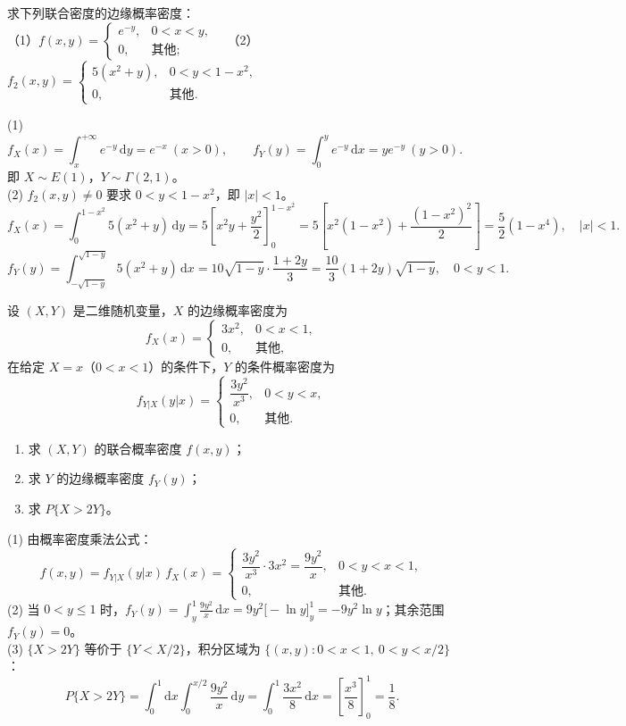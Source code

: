 ﻿\documentclass[lang=cn,11pt]{elegantbook}
\begin{document}
\begin{exercise}[两种边缘密度计算] \label{exer:3-c10}
求下列联合密度的边缘概率密度：\\
（1）$f(x,y) = \begin{cases} e^{-y}, & 0 < x < y, \\ 0, & \text{其他}; \end{cases}$~~（2）$f_2(x,y) = \begin{cases} 5(x^2+y), & 0 < y < 1-x^2, \\ 0, & \text{其他}. \end{cases}$
\end{exercise}
\begin{solution}
(1)
\[
f_X(x) = \int_x^{+\infty}e^{-y}\,\mathrm{d}y = e^{-x}\ (x > 0), \qquad f_Y(y) = \int_0^y e^{-y}\,\mathrm{d}x = ye^{-y}\ (y > 0).
\]
即 $X \sim E(1)$，$Y \sim \Gamma(2,1)$。\\
(2) $f_2(x,y) \neq 0$ 要求 $0 < y < 1-x^2$，即 $|x| < 1$。
\[
f_X(x) = \int_0^{1-x^2}5(x^2+y)\,\mathrm{d}y = 5\left[x^2y + \frac{y^2}{2}\right]_0^{1-x^2} = 5\left[x^2(1-x^2) + \frac{(1-x^2)^2}{2}\right] = \frac{5}{2}(1-x^4),\quad |x|<1.
\]
\[
f_Y(y) = \int_{-\sqrt{1-y}}^{\sqrt{1-y}}5(x^2+y)\,\mathrm{d}x = 10\sqrt{1-y}\cdot\frac{1+2y}{3} = \frac{10}{3}(1+2y)\sqrt{1-y},\quad 0<y<1.
\]
\end{solution}

\begin{exercise}\label{exer:3-4}
设 $(X,Y)$ 是二维随机变量，$X$ 的边缘概率密度为
\[
f_X(x) = \begin{cases} 3x^2, & 0 < x < 1, \\ 0, & \text{其他}, \end{cases}
\]
在给定 $X = x$（$0 < x < 1$）的条件下，$Y$ 的条件概率密度为
\[
f_{Y|X}(y|x) = \begin{cases} \dfrac{3y^2}{x^3}, & 0 < y < x, \\ 0, & \text{其他}. \end{cases}
\]
\begin{enumerate}
    \item[(1)] 求 $(X,Y)$ 的联合概率密度 $f(x,y)$；
    \item[(2)] 求 $Y$ 的边缘概率密度 $f_Y(y)$；
    \item[(3)] 求 $P\{X > 2Y\}$。
\end{enumerate}
\end{exercise}
\begin{solution}
(1) 由概率密度乘法公式：
\[
f(x,y) = f_{Y|X}(y|x)\,f_X(x) = \begin{cases} \dfrac{3y^2}{x^3} \cdot 3x^2 = \dfrac{9y^2}{x}, & 0 < y < x < 1, \\ 0, & \text{其他}. \end{cases}
\]
(2) 当 $0 < y \leqslant 1$ 时，$f_Y(y) = \displaystyle\int_y^1 \frac{9y^2}{x}\,\mathrm{d}x = 9y^2\bigl[-\ln y\bigr]_y^1 = -9y^2\ln y$；其余范围 $f_Y(y) = 0$。\\
(3) $\{X > 2Y\}$ 等价于 $\{Y < X/2\}$，积分区域为 $\{(x,y): 0 < x < 1,\ 0 < y < x/2\}$：
\[
P\{X > 2Y\} = \int_0^1\mathrm{d}x\int_0^{x/2}\frac{9y^2}{x}\,\mathrm{d}y = \int_0^1 \frac{3x^2}{8}\,\mathrm{d}x = \left[\frac{x^3}{8}\right]_0^1 = \frac{1}{8}.
\]
\end{solution}
\end{document}
